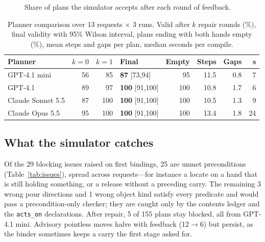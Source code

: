 \documentclass[10pt,twocolumn,letterpaper]{article}
\newcommand{\code}[1]{\texttt{\small #1}}
\begin{document}
\begin{figure}[t]
\centering
{}
\caption{Share of plans the simulator accepts after each round of feedback.}
\label{fig:rounds}
\end{figure}

\begin{table}[t]
\centering\small
\caption{Planner comparison over 13 requests $\times$ 3 runs. Valid after $k$ repair rounds (\%), final validity with
95\% Wilson interval, plans ending with both hands empty (\%), mean steps and gaps per plan, median seconds per compile.}
\label{tab:planners}
\begin{tabular}{@{}lrrlrrrr@{}}
\toprule
Planner & $k{=}0$ & $k{=}1$ & Final & Empty & Steps & Gaps & s\\
\midrule
GPT-4.1 mini & 56 & 85 & \textbf{87} {\scriptsize[73,94]} & 95 & 11.5 & 0.8 & 7\\
GPT-4.1 & 89 & 97 & \textbf{100} {\scriptsize[91,100]} & 100 & 10.8 & 1.7 & 6\\
Claude Sonnet 5.5 & 87 & 100 & \textbf{100} {\scriptsize[91,100]} & 100 & 10.5 & 1.3 & 9\\
Claude Opus 5.5 & 95 & 100 & \textbf{100} {\scriptsize[91,100]} & 100 & 13.4 & 1.8 & 24\\
\bottomrule
\end{tabular}
\end{table}

\subsection{What the simulator catches}
Of the 29 blocking issues raised on first bindings, 25 are unmet preconditions (Table~\ref{tab:issues}), spread across
requests---for instance a locate on a hand that is still holding something, or a release without a preceding carry.
The remaining 3 wrong pour directions and 1 wrong object kind satisfy every predicate and would pass a
precondition-only checker; they are caught only by the contents ledger and the \code{acts\_on} declarations. After
repair, 5 of 155 plans stay blocked, all from GPT-4.1 mini. Advisory pointless moves halve with feedback (12$\to$6) but
persist, as the binder sometimes keeps a carry the first stage asked for.
\end{document}
